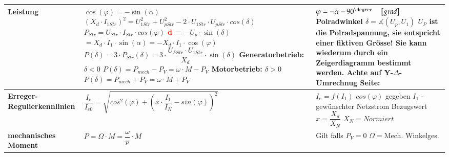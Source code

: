 \begin{longtable}[b]{| C{5cm}| P{8.5cm} | P{5 cm} |}
        \textbf{Leistung} \newline 
         &
        $\cos(\varphi) = -\sin(\alpha) $ \newline\newline
       	$ (X_d \cdot I_{1Str})^2=U_{1Str}^2+U_{pStr}^2 - 2\cdot U_{1Str}\cdot U_{pStr}\cdot cos(\delta) $ \newline \newline
       	$P_{Str} = U_{Str}\cdot I_{Str}\cdot cos(\varphi)$ \newline
        \textcolor{red}{d} = $-U_p\cdot\sin(\delta)$ \newline
        \qquad $= X_d\cdot I_1\cdot\sin(\alpha) = -X_d\cdot I_1\cdot\cos(\varphi)$ \newline \newline
        $P(\delta) = 3\cdot P_{Str}(\delta)= 3\cdot\dfrac{U_{PStr}\cdot U_{1Str}}{X_d}\cdot\sin(\delta)$ \newline
        \textbf{Generatorbetrieb:} $\delta < 0$ \newline
        $P(\delta) = P_{mech}-P_V = \omega\cdot M - P_V$ \newline
        \textbf{Motorbetrieb:} $\delta > 0$ \newline
        $P(\delta) = P_{mech} + P_V = \omega\cdot M + P_V$ &
         $\varphi = -\alpha - 90^\degree   \quad\left[ grad \right]$ \newline \newline
        Polradwinkel $\delta =  \measuredangle (U_p, U_1)$  \newline \newline
        $U_P$ ist die Polradspannung, sie entspricht einer fiktiven Grösse! Sie kann wiederum durch ein Zeigerdiagramm bestimmt werden.\newline\newline
        \textbf{ Achte auf Y-$ \Delta $-Umrechnug} \newline
        Seite: \pageref{SternDreieck}
        \\ \hline
		\textbf{Erreger-Regulierkennlinien} & 
		$ \dfrac{I_e}{I_{e0}} = \sqrt{cos^2(\varphi) + \left(x\cdot\dfrac{I_1}{I_N}-sin(\varphi)\right)^2}$ &
        $I_e = f(I_1)$ \newline $cos(\varphi)$ gegeben \newline $I_1$ - gewünschter Netzstrom \newline Bezugswert $x = \dfrac{X_d}{X_N}$ \newline $ X_N = Normiert $
		\\ \hline
		\textbf{mechanisches Moment} &  $P = \Omega\cdot M = \dfrac{\omega}{p}\cdot M$ & Gilt falls $P_V = 0$\newline
        $ \Omega = $Mech. Winkelges. 
		\\ \hline	
	    \end{longtable}
    
